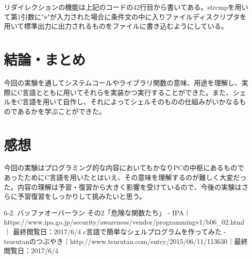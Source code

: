 \documentclass[a4paper,12pt]{jsarticle}
\begin{document}
\vspace{2zh}
リダイレクションの機能は上記のコードの42行目から書いてある。strcmpを用いて第1引数に"\verb|>|"が入力された場合に条件文の中に入りファイルディスクリプタを用いて標準出力に出力されるものをファイルに書き込むようにしている。

\section{結論・まとめ}
今回の実験を通してシステムコールやライブラリ関数の意味、用途を理解し、実際にC言語とともに用いてそれらを実装かつ実行することができた。また、シェルをC言語を用いて自作し、それによってシェルそのものの仕組みがいかなるものであるかを学ぶことができた。

\section{感想}
今回の実験はプログラミング的な内容においてもかなりPCの中枢にあるものであったためにC言語を用いたとはいえ、その意味を理解するのが難しく大変だった。内容の理解は予習・復習から大きく影響を受けているので、今後の実験はさらに予習復習をしっかりして挑みたいと思う。

\begin{thebibliography}{99}
  6-2. バッファオーバーラン その2「危険な関数たち」 - IPA｜https://www.ipa.go.jp/security/awareness/vendor/programmingv1/b06\_02.html｜	最終閲覧日：2017/6/4
  c言語で簡単なシェルプログラムを作ってみた - tsurutanのつぶやき｜http://www.tsurutan.com/entry/2015/06/11/113630｜最終閲覧日：2017/6/4
\end{thebibliography}
\end{document}
